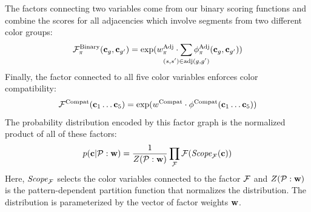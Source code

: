 The factors connecting two variables come from our binary scoring functions and combine the scores for all adjacencies which involve segments from two different color groups:
\begin{equation*}
\factor^{\textrm{Binary}}_\prop(\colors_\group, \colors_\groupprime) =
	\exp( \adjTermWeight \cdot \sum_{\mathclap{(\segment, \segprime) \in \adj(\group, \groupprime)}} \adjInstStats( \colors_\group, \colors_\groupprime))
\end{equation*}
Finally, the factor connected to all five color variables enforces color compatibility:
\begin{equation*}
\mathcal{F}^{\textrm{Compat}}(\mathbf{c}_1 \ldots \mathbf{c}_5) = \exp(w^{\textrm{Compat}} \cdot \phi^{\textrm{Compat}}(\mathbf{c}_1 \ldots \mathbf{c}_5))
\end{equation*}
The probability distribution encoded by this factor graph is the normalized product of all of these factors:
\begin{equation*}
p(\mathbf{c} | \mathcal{P} : \mathbf{w}) = \frac{1}{Z(\mathcal{P} : \mathbf{w})} \prod_{\mathcal{F}} \mathcal{F}(\textit{Scope}_{\mathcal{F}}(\mathbf{c}))
\end{equation*}
Here, $\textit{Scope}_{\mathcal{F}}$ selects the color variables connected to the factor $\mathcal{F}$ and $Z(\mathcal{P} : \mathbf{w})$ is the pattern-dependent partition function that normalizes the distribution. The distribution is parameterized by the vector of factor weights $\mathbf{w}$.

